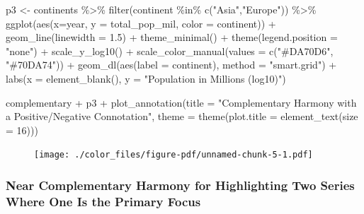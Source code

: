 \documentclass[
  letterpaper,
]{book}
\newenvironment{Shaded}{\begin{snugshade}}{\end{snugshade}}
\newcommand{\AttributeTok}[1]{\textcolor[rgb]{0.40,0.45,0.13}{#1}}
\newcommand{\DecValTok}[1]{\textcolor[rgb]{0.68,0.00,0.00}{#1}}
\newcommand{\FloatTok}[1]{\textcolor[rgb]{0.68,0.00,0.00}{#1}}
\newcommand{\FunctionTok}[1]{\textcolor[rgb]{0.28,0.35,0.67}{#1}}
\newcommand{\NormalTok}[1]{\textcolor[rgb]{0.00,0.23,0.31}{#1}}
\newcommand{\OtherTok}[1]{\textcolor[rgb]{0.00,0.23,0.31}{#1}}
\newcommand{\SpecialCharTok}[1]{\textcolor[rgb]{0.37,0.37,0.37}{#1}}
\newcommand{\StringTok}[1]{\textcolor[rgb]{0.13,0.47,0.30}{#1}}
\begin{document}
\begin{Shaded}
\begin{Highlighting}[]
\NormalTok{p3 }\OtherTok{\textless{}{-}}\NormalTok{ continents }\SpecialCharTok{\%\textgreater{}\%} 
  \FunctionTok{filter}\NormalTok{(continent }\SpecialCharTok{\%in\%} \FunctionTok{c}\NormalTok{(}\StringTok{"Asia"}\NormalTok{,}\StringTok{"Europe"}\NormalTok{)) }\SpecialCharTok{\%\textgreater{}\%} 
  \FunctionTok{ggplot}\NormalTok{(}\FunctionTok{aes}\NormalTok{(}\AttributeTok{x=}\NormalTok{year, }\AttributeTok{y =}\NormalTok{ total\_pop\_mil, }\AttributeTok{color =}\NormalTok{ continent)) }\SpecialCharTok{+} 
  \FunctionTok{geom\_line}\NormalTok{(}\AttributeTok{linewidth =} \FloatTok{1.5}\NormalTok{) }\SpecialCharTok{+} 
  \FunctionTok{theme\_minimal}\NormalTok{() }\SpecialCharTok{+} 
  \FunctionTok{theme}\NormalTok{(}\AttributeTok{legend.position =} \StringTok{"none"}\NormalTok{) }\SpecialCharTok{+}
  \FunctionTok{scale\_y\_log10}\NormalTok{() }\SpecialCharTok{+} 
  \FunctionTok{scale\_color\_manual}\NormalTok{(}\AttributeTok{values =} \FunctionTok{c}\NormalTok{(}\StringTok{"\#DA70D6"}\NormalTok{, }\StringTok{"\#70DA74"}\NormalTok{)) }\SpecialCharTok{+}
  \FunctionTok{geom\_dl}\NormalTok{(}\FunctionTok{aes}\NormalTok{(}\AttributeTok{label =}\NormalTok{ continent), }\AttributeTok{method =} \StringTok{"smart.grid"}\NormalTok{) }\SpecialCharTok{+}
  \FunctionTok{labs}\NormalTok{(}\AttributeTok{x =} \FunctionTok{element\_blank}\NormalTok{(), }\AttributeTok{y =} \StringTok{"Population in Millions (log10)"}\NormalTok{)}
  

\NormalTok{complementary }\SpecialCharTok{+}\NormalTok{ p3 }\SpecialCharTok{+} \FunctionTok{plot\_annotation}\NormalTok{(}\AttributeTok{title =} \StringTok{"Complementary Harmony with a Positive/Negative Connotation"}\NormalTok{, }\AttributeTok{theme =} \FunctionTok{theme}\NormalTok{(}\AttributeTok{plot.title =} \FunctionTok{element\_text}\NormalTok{(}\AttributeTok{size =} \DecValTok{16}\NormalTok{)))}
\end{Highlighting}
\end{Shaded}

\begin{figure}[H]

{\centering \texttt{[image: ./color\_files/figure-pdf/unnamed-chunk-5-1.pdf]}

}

\end{figure}

\hypertarget{near-complementary-harmony-for-highlighting-two-series-where-one-is-the-primary-focus}{%
\subsubsection{Near Complementary Harmony for Highlighting Two Series
Where One Is the Primary
Focus}\label{near-complementary-harmony-for-highlighting-two-series-where-one-is-the-primary-focus}}
\end{document}
